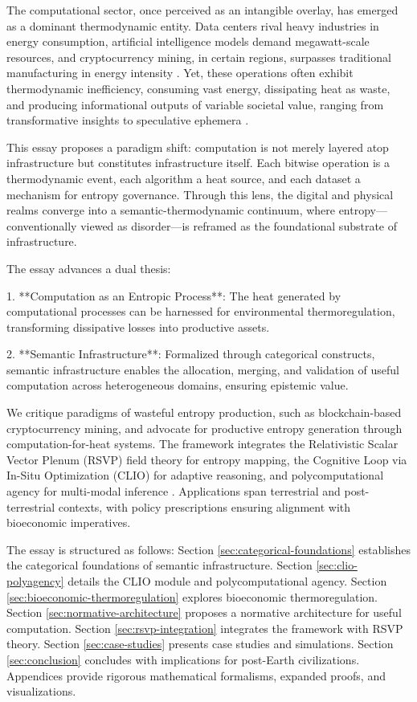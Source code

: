 \documentclass[12pt]{article}
\begin{document}
The computational sector, once perceived as an intangible overlay, has emerged as a dominant thermodynamic entity. Data centers rival heavy industries in energy consumption, artificial intelligence models demand megawatt-scale resources, and cryptocurrency mining, in certain regions, surpasses traditional manufacturing in energy intensity \citep{Markov2014, DeVries2021}. Yet, these operations often exhibit thermodynamic inefficiency, consuming vast energy, dissipating heat as waste, and producing informational outputs of variable societal value, ranging from transformative insights to speculative ephemera \citep{Landauer1961}.

This essay proposes a paradigm shift: computation is not merely layered atop infrastructure but constitutes infrastructure itself. Each bitwise operation is a thermodynamic event, each algorithm a heat source, and each dataset a mechanism for entropy governance. Through this lens, the digital and physical realms converge into a semantic-thermodynamic continuum, where entropy—conventionally viewed as disorder—is reframed as the foundational substrate of infrastructure.

The essay advances a dual thesis:

1. **Computation as an Entropic Process**: The heat generated by computational processes can be harnessed for environmental thermoregulation, transforming dissipative losses into productive assets.

2. **Semantic Infrastructure**: Formalized through categorical constructs, semantic infrastructure enables the allocation, merging, and validation of useful computation across heterogeneous domains, ensuring epistemic value.

We critique paradigms of wasteful entropy production, such as blockchain-based cryptocurrency mining, and advocate for productive entropy generation through computation-for-heat systems. The framework integrates the Relativistic Scalar Vector Plenum (RSVP) field theory for entropy mapping, the Cognitive Loop via In-Situ Optimization (CLIO) for adaptive reasoning, and polycomputational agency for multi-modal inference \citep{ChengBroadbentChappell2025, Shulman2012, AbramskyCoecke2004}. Applications span terrestrial and post-terrestrial contexts, with policy prescriptions ensuring alignment with bioeconomic imperatives.

The essay is structured as follows: Section \ref{sec:categorical-foundations} establishes the categorical foundations of semantic infrastructure. Section \ref{sec:clio-polyagency} details the CLIO module and polycomputational agency. Section \ref{sec:bioeconomic-thermoregulation} explores bioeconomic thermoregulation. Section \ref{sec:normative-architecture} proposes a normative architecture for useful computation. Section \ref{sec:rsvp-integration} integrates the framework with RSVP theory. Section \ref{sec:case-studies} presents case studies and simulations. Section \ref{sec:conclusion} concludes with implications for post-Earth civilizations. Appendices provide rigorous mathematical formalisms, expanded proofs, and visualizations.
\end{document}
